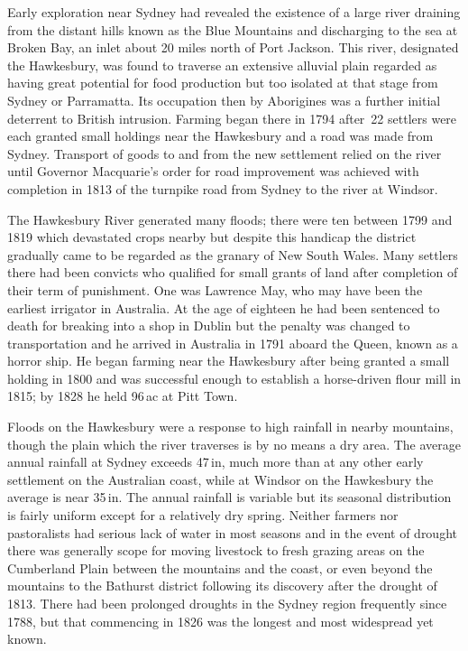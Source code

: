 Early exploration near Sydney had revealed the existence of a large
river draining from the distant hills known as the Blue Mountains and
discharging to the sea at Broken Bay, an inlet about 20 miles north of
Port Jackson.  This river, designated the
Hawkesbury, was found to traverse an extensive
alluvial plain regarded as having great potential for food production
but too isolated at that stage from Sydney or Parramatta.  Its
occupation then by Aborigines was a further initial deterrent to
British intrusion.  Farming began there in 1794 after~22 settlers were
each granted small holdings near the Hawkesbury and a road was made
from Sydney. Transport of goods to and from the new settlement relied
on the river until Governor Macquarie's order
for road improvement was achieved with completion in 1813 of the
turnpike road from Sydney to the river at Windsor.

The Hawkesbury River generated many floods; there were ten between
1799 and 1819 which devastated crops nearby but despite this handicap
the district gradually came to be regarded as the granary of New South
Wales. Many settlers there had been convicts who qualified for small
grants of land after completion of their term of punishment. One was
Lawrence May, who may have been the earliest irrigator
in Australia. At the age of eighteen he had been sentenced to death
for breaking into a shop in Dublin but the penalty was changed to
transportation and he arrived in Australia in 1791 aboard the Queen,
known as a horror ship. He began farming near the Hawkesbury after
being granted a small holding in 1800 and was successful enough to
establish a horse-driven flour mill in 1815; by 1828 he held 96\,ac at
Pitt Town.

Floods on the Hawkesbury were a response to high rainfall in nearby
mountains, though the plain which the river traverses is by no means a
dry area.  The average annual rainfall at Sydney exceeds 47\,in, much
more than at any other early settlement on the Australian coast, while
at Windsor  on the Hawkesbury the average is near
35\,in. The annual rainfall is variable but its seasonal distribution
is fairly uniform except for a relatively dry spring.  Neither farmers
nor pastoralists had serious lack of water in most seasons and in the
event of drought there was generally scope for moving livestock to
fresh grazing areas on the Cumberland Plain between the mountains and
the coast, or even beyond the mountains to the Bathurst district
following its discovery after the drought of 1813.  There had been
prolonged droughts in the Sydney region frequently since 1788, but
that commencing in 1826 was the longest and most widespread yet
known.

